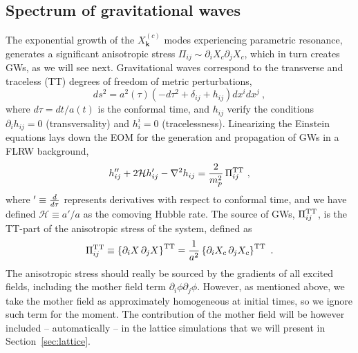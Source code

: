 \documentclass[a4paper,11pt]{article}
\begin{document}
\subsection{Spectrum of gravitational waves}
\label{subsec:GWspectrum}

The exponential growth of the $X^{(c)}_{\mathbf{k}}$ modes experiencing parametric resonance, generates a significant anisotropic stress $\Pi_{ij} \sim \partial_i X_c \partial_j X_c$, which in turn creates GWs, as we will see next.  Gravitational waves correspond to the transverse and traceless (TT) degrees of freedom of metric perturbations,
\begin{equation}
ds^{2}= a^{2}(\tau)\left(-d\tau^{2} + \delta_{ij}+h_{ij}\right)dx^{i}dx^{j}\ ,
\end{equation} 
where $d\tau = dt/a(t)$ is the conformal time, and $h_{ij}$ verify the conditions $\partial_{i}h_{ij} = 0$ (transversality) and $h_{i}^{i} = 0$ (tracelessness). Linearizing the Einstein equations lays down the EOM for the generation and propagation of GWs in a FLRW background, 
\begin{eqnarray}
{{h}}_{ij}'' + 2\mathcal{H} {{h}}_{ij}' - \nabla^2 h_{ij} = {2\over m_p^2}\,\Pi_{ij}^{\rm TT} \ , \label{eq:GWeom}
\end{eqnarray}
where $' \equiv {d\over d\tau}$ represents derivatives with respect to conformal time, and we have defined $\mathcal{H} \equiv a'/a$ as the comoving Hubble rate. The source of GWs, $\Pi_{ij}^{\rm TT}$, is the TT-part of the anisotropic stress of the system, defined as
\begin{equation}
\label{StressTensorChi}
\Pi_{ij}^{{\rm TT}} \equiv \left\lbrace \partial_{i}X\,\partial_{j}X \right\rbrace^{{\rm TT}} = {1\over a^2}\left\lbrace \partial_{i}X_c \,\partial_{j}X_c \right\rbrace^{{\rm TT}}\ .
\end{equation}
The anisotropic stress should really be sourced by the gradients of all excited fields, including the mother field term $\partial_i \phi \partial_j \phi$. However, as mentioned above, we take the mother field as approximately homogeneous at initial times, so we ignore such term for the moment. The contribution of the mother field will be however included -- automatically -- in the lattice simulations that we will present in Section~\ref{sec:lattice}.
\end{document}
